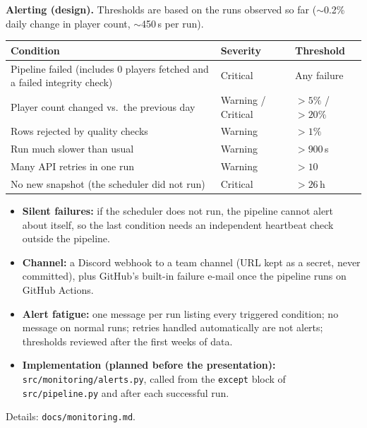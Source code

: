 \documentclass[11pt,a4paper]{article}
\begin{document}
\medskip
\noindent\textbf{Alerting (design).} Thresholds are based on the runs
observed so far ($\sim$0.2\% daily change in player count, $\sim$450\,s per
run).
\begin{center}
\small
\begin{tabularx}{\textwidth}{@{}Yp{2.3cm}p{2.6cm}@{}}
\toprule
\textbf{Condition} & \textbf{Severity} & \textbf{Threshold} \\
\midrule
Pipeline failed (includes 0 players fetched and a failed integrity check) & Critical & Any failure \\
Player count changed vs.\ the previous day & Warning / Critical & $>5\%$ / $>20\%$ \\
Rows rejected by quality checks & Warning & $>1\%$ \\
Run much slower than usual & Warning & $>900$\,s \\
Many API retries in one run & Warning & $>10$ \\
No new snapshot (the scheduler did not run) & Critical & $>26$\,h \\
\bottomrule
\end{tabularx}
\end{center}
\begin{itemize}
  \item \textbf{Silent failures:} if the scheduler does not run, the pipeline
        cannot alert about itself, so the last condition needs an independent
        heartbeat check outside the pipeline.
  \item \textbf{Channel:} a Discord webhook to a team channel (URL kept as a
        secret, never committed), plus GitHub's built-in failure e-mail once
        the pipeline runs on GitHub Actions.
  \item \textbf{Alert fatigue:} one message per run listing every triggered
        condition; no message on normal runs; retries handled automatically
        are not alerts; thresholds reviewed after the first weeks of data.
  \item \textbf{Implementation (planned before the presentation):}
        \texttt{src/monitoring/alerts.py}, called from the \texttt{except}
        block of \texttt{src/pipeline.py} and after each successful run.
\end{itemize}
Details: \texttt{docs/monitoring.md}.

\end{document}
